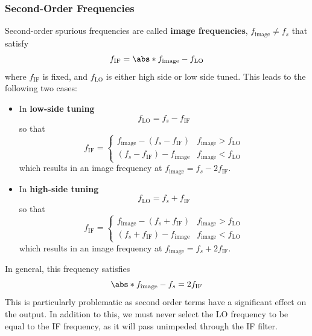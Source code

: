 \documentclass{article}
\begin{document}
\subsubsection{Second-Order Frequencies}
Second-order spurious frequencies are called \textbf{image
frequencies}, \(f_{\mathrm{image}} \neq f_s\) that satisfy
\begin{equation*}
    f_{\mathrm{IF}} = \abs*{f_{\mathrm{image}} - f_{\mathrm{LO}}}
\end{equation*}
where \(f_{\mathrm{IF}}\) is fixed, and \(f_{\mathrm{LO}}\) is either
high side or low side tuned. This leads to the following two cases:
\begin{itemize}
    \item In \textbf{low-side tuning}
          \begin{equation*}
              f_{\mathrm{LO}} = f_s - f_{\mathrm{IF}}
          \end{equation*}
          so that
          \begin{equation*}
              f_{\mathrm{IF}} =
              \begin{cases}
                  f_{\mathrm{image}} - \left( f_s - f_{\mathrm{IF}} \right) & f_{\mathrm{image}} > f_{\mathrm{LO}} \\
                  \left( f_s - f_{\mathrm{IF}} \right) - f_{\mathrm{image}} & f_{\mathrm{image}} < f_{\mathrm{LO}}
              \end{cases}
          \end{equation*}
          which results in an image frequency at \(f_{\mathrm{image}} = f_s - 2f_{\mathrm{IF}}\).
    \item In \textbf{high-side tuning}
          \begin{equation*}
              f_{\mathrm{LO}} = f_s + f_{\mathrm{IF}}
          \end{equation*}
          so that
          \begin{equation*}
              f_{\mathrm{IF}} =
              \begin{cases}
                  f_{\mathrm{image}} - \left( f_s + f_{\mathrm{IF}} \right) & f_{\mathrm{image}} > f_{\mathrm{LO}} \\
                  \left( f_s + f_{\mathrm{IF}} \right) - f_{\mathrm{image}} & f_{\mathrm{image}} < f_{\mathrm{LO}}
              \end{cases}
          \end{equation*}
          which results in an image frequency at \(f_{\mathrm{image}} = f_s + 2f_{\mathrm{IF}}\).
\end{itemize}
In general, this frequency satisfies
\begin{equation*}
    \abs*{f_{\mathrm{image}} - f_s} = 2f_{\mathrm{IF}}
\end{equation*}
This is particularly problematic as second order terms have a significant
effect on the output. In addition to this, we must never select the LO
frequency to be equal to the IF frequency, as it will pass unimpeded
through the IF filter.
\end{document}
